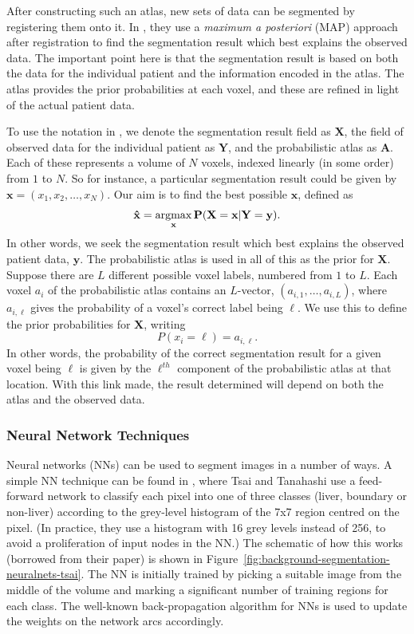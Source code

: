 After constructing such an atlas, new sets of data can be segmented by registering them onto it. In \cite{park03}, they use a \emph{maximum a posteriori} (MAP) approach after registration to find the segmentation result which best explains the observed data. The important point here is that the segmentation result is based on both the data for the individual patient and the information encoded in the atlas. The atlas provides the prior probabilities at each voxel, and these are refined in light of the actual patient data.

To use the notation in \cite{park03}, we denote the segmentation result field as $\mathbf{X}$, the field of observed data for the individual patient as $\mathbf{Y}$, and the probabilistic atlas as $\mathbf{A}$. Each of these represents a volume of $N$ voxels, indexed linearly (in some order) from $1$ to $N$. So for instance, a particular segmentation result could be given by $\mathbf{x} = (x_1, x_2, \ldots, x_N)$. Our aim is to find the best possible $\mathbf{x}$, defined as
%
\[
\mathbf{\hat{x}} = \mathop{\rm argmax}_{\mathbf{x}} \mathbf{P}(\mathbf{X} = \mathbf{x} | \mathbf{Y} = \mathbf{y}).
\]
%
In other words, we seek the segmentation result which best explains the observed patient data, $\mathbf{y}$. The probabilistic atlas is used in all of this as the prior for $\mathbf{X}$. Suppose there are $L$ different possible voxel labels, numbered from $1$ to $L$. Each voxel $a_i$ of the probabilistic atlas contains an $L$-vector, $(a_{i,1}, \ldots, a_{i,L})$, where $a_{i,\ell}$ gives the probability of a voxel's correct label being $\ell$. We use this to define the prior probabilities for $\mathbf{X}$, writing
%
\[
P(x_i = \ell) = a_{i,\ell}.
\]
%
In other words, the probability of the correct segmentation result for a given voxel being $\ell$ is given by the $\ell^{th}$ component of the probabilistic atlas at that location. With this link made, the result determined will depend on both the atlas and the observed data.

\subsubsection{Neural Network Techniques}

Neural networks (NNs) can be used to segment images in a number of ways. A simple NN technique can be found in \cite{tsai94}, where Tsai and Tanahashi use a feed-forward network to classify each pixel into one of three classes (liver, boundary or non-liver) according to the grey-level histogram of the 7x7 region centred on the pixel. (In practice, they use a histogram with 16 grey levels instead of 256, to avoid a proliferation of input nodes in the NN.) The schematic of how this works (borrowed from their paper) is shown in Figure~\ref{fig:background-segmentation-neuralnets-tsai}. The NN is initially trained by picking a suitable image from the middle of the volume and marking a significant number of training regions for each class. The well-known back-propagation algorithm for NNs \cite{aima} is used to update the weights on the network arcs accordingly.

